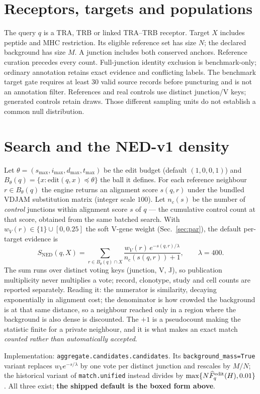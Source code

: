 \documentclass[10pt,a4paper]{article}
\theoremstyle{definition}
\newcommand{\code}[1]{\texttt{\small #1}}
\begin{document}
\section{Receptors, targets and populations}
The query $q$ is a TRA, TRB or linked TRA--TRB receptor. Target $X$ includes peptide and MHC
restriction. Its eligible reference set has size $N$; the declared background has size $M$. A
junction includes both conserved anchors. Reference curation precedes every count. Full-junction identity exclusion is benchmark-only;
ordinary annotation retains exact evidence and conflicting labels. The benchmark target gate
requires at least 30 valid source records before puncturing and is not an annotation filter. References and real controls use distinct junction/V keys; generated controls
retain draws. Those different sampling units do not establish a common null distribution.

\section{Search and the NED-v1 density}
Let $\theta=(s_{\max},i_{\max},d_{\max},t_{\max})$ be the edit budget (default $(1,0,0,1)$) and
$B_\theta(q)=\{x:\mathrm{edit}(q,x)\preceq\theta\}$ the ball it defines. For each reference
neighbour $r\in B_\theta(q)$ the engine returns an alignment score $s(q,r)$ under the bundled VDJAM
substitution matrix (integer scale $100$). Let $n_c(s)$ be the number of \emph{control} junctions
within alignment score $s$ of $q$ --- the cumulative control count at that score, obtained from the
same batched search. With $w_V(r)\in\{1\}\cup[0,0.25]$ the soft V-gene weight (Sec.~\ref{sec:par}),
the default per-target evidence is
\[
\boxed{\;S_{\mathrm{NED}}(q,X)=\sum_{r\in B_\theta(q)\cap X}
\frac{w_V(r)\,e^{-s(q,r)/\lambda}}{n_c(s(q,r))+1},\qquad \lambda=400.\;}
\]
The sum runs over distinct voting keys (junction, V, J), so publication multiplicity never
multiplies a vote; record, clonotype, study and cell counts are reported separately.
Reading it: the numerator is similarity, decaying exponentially in alignment cost; the denominator
is how crowded the background is at that same distance, so a neighbour reached only in a region
where the background is also dense is discounted. The $+1$ is a pseudocount making the statistic
finite for a private neighbour, and it is what makes an exact match
\emph{counted rather than automatically accepted}.

Implementation: \code{aggregate.candidates.candidates}. Its \code{background\_mass=True} variant
replaces $w_Ve^{-s/\lambda}$ by one vote per distinct junction and rescales by $M/N$; the
historical variant of \code{match.unified} instead divides by $\max\{N\widehat F^{\rm edit}_q(H),0.01\}$.
All three exist; \textbf{the shipped default is the boxed form above}.
\end{document}
